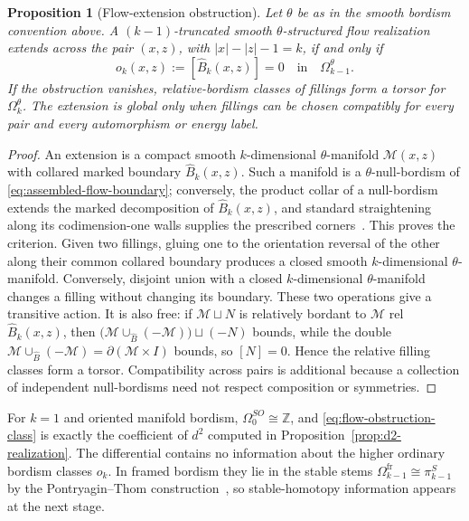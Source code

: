 \documentclass[11pt,letterpaper,twoside]{article}
\theoremstyle{plain}
\newtheorem{proposition}[theorem]{Proposition}
\theoremstyle{definition}
\theoremstyle{remark}
\let\cite\citep
\begin{document}
\begin{proposition}[Flow-extension obstruction]\label{prop:flow-obstruction-tower}
Let \(\theta\) be as in the smooth bordism convention above.  A \((k-1)\)-truncated smooth \(\theta\)-structured flow realization extends across the pair \((x,z)\), with \(|x|-|z|-1=k\), if and only if
\begin{equation}\label{eq:flow-obstruction-class}
 o_k(x,z):=[\widehat B_k(x,z)]
 =0\quad\text{in}\quad\Omega_{k-1}^{\theta}.
\end{equation}
If the obstruction vanishes, relative-bordism classes of fillings form a torsor for \(\Omega_k^\theta\).  The extension is global only when fillings can be chosen compatibly for every pair and every automorphism or energy label.
\end{proposition}

\begin{proof}
An extension is a compact smooth \(k\)-dimensional \(\theta\)-manifold \(\mathcal M(x,z)\) with collared marked boundary \(\widehat B_k(x,z)\).  Such a manifold is a \(\theta\)-null-bordism of \eqref{eq:assembled-flow-boundary}; conversely, the product collar of a null-bordism extends the marked decomposition of \(\widehat B_k(x,z)\), and standard straightening along its codimension-one walls supplies the prescribed corners~\cite{laures2000}.  This proves the criterion.  Given two fillings, gluing one to the orientation reversal of the other along their common collared boundary produces a closed smooth \(k\)-dimensional \(\theta\)-manifold.  Conversely, disjoint union with a closed \(k\)-dimensional \(\theta\)-manifold changes a filling without changing its boundary.  These two operations give a transitive action.  It is also free: if \(\mathcal M\sqcup N\) is relatively bordant to \(\mathcal M\) rel \(\widehat B_k(x,z)\), then \(\bigl(\mathcal M\cup_{\widehat B}(-\mathcal M)\bigr)\sqcup(-N)\) bounds, while the double \(\mathcal M\cup_{\widehat B}(-\mathcal M)=\partial(\mathcal M\times I)\) bounds, so \([N]=0\).  Hence the relative filling classes form a torsor.  Compatibility across pairs is additional because a collection of independent null-bordisms need not respect composition or symmetries.
\end{proof}

For \(k=1\) and oriented manifold bordism, \(\Omega_0^{SO}\cong\mathbb Z\), and \eqref{eq:flow-obstruction-class} is exactly the coefficient of \(d^2\) computed in Proposition~\ref{prop:d2-realization}.  The differential contains no information about the higher ordinary bordism classes \(o_k\).  In framed bordism they lie in the stable stems
\(
\Omega_{k-1}^{\mathrm{fr}}\cong\pi_{k-1}^{S}
\) by the Pontryagin--Thom construction~\cite[Thm.~12.30 and p.~230]{switzer1975}, so stable-homotopy information appears at the next stage.
\end{document}
